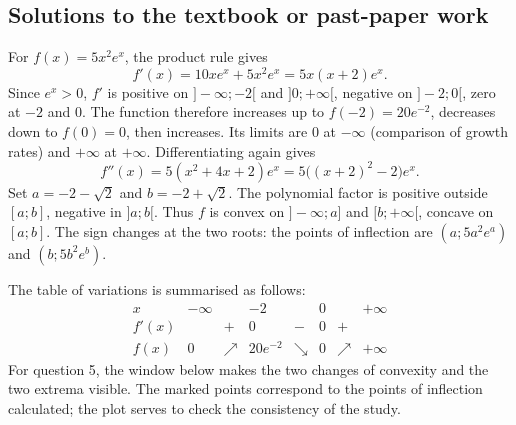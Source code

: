 \clearpage

\subsection{Solutions to the textbook or past-paper work}For $f(x)=5x^2e^x$, the product rule gives
\[f'(x)=10xe^x+5x^2e^x=5x(x+2)e^x.\]
Since $e^x>0$, $f'$ is positive on $]-\infty;-2[$ and $]0;+\infty[$, negative on $]-2;0[$, zero at $-2$ and $0$. The function therefore increases up to $f(-2)=20e^{-2}$, decreases down to $f(0)=0$, then increases. Its limits are $0$ at $-\infty$ (comparison of growth rates) and $+\infty$ at $+\infty$.
Differentiating again gives
\[f''(x)=5(x^2+4x+2)e^x=5\bigl((x+2)^2-2\bigr)e^x.\]
Set $a=-2-\sqrt2$ and $b=-2+\sqrt2$. The polynomial factor is positive outside $[a;b]$, negative in $]a;b[$. Thus $f$ is convex on $]-\infty;a]$ and $[b;+\infty[$, concave on $[a;b]$. The sign changes at the two roots: the points of inflection are $(a;5a^2e^a)$ and $(b;5b^2e^b)$.\par The table of variations is summarised as follows:
\[\begin{array}{c|ccccccc}x&-\infty&&-2&&0&&+\infty\\\hline f'(x)&&+&0&-&0&+&\\\hline f(x)&0&\nearrow&20e^{-2}&\searrow&0&\nearrow&+\infty\end{array}\]
For question 5, the window below makes the two changes of convexity and the two extrema visible. The marked points correspond to the points of inflection calculated; the plot serves to check the consistency of the study.
\begin{center}\end{center}

\fi

